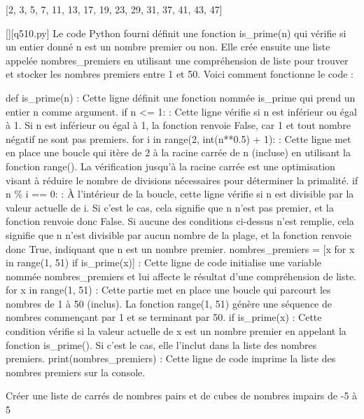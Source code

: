 [2, 3, 5, 7, 11, 13, 17, 19, 23, 29, 31, 37, 41, 43, 47]
        \par
        \begin{solution}
            \renewcommand{\nomfichier}{q510.py}
            \pythonfile{\chemincode \nomfichier}[][\nomfichier]
            Le code Python fourni définit une fonction is\_prime(n) qui vérifie si un entier donné n est un nombre premier ou non. Elle crée ensuite une liste appelée nombres\_premiers en utilisant une compréhension de liste pour trouver et stocker les nombres premiers entre 1 et 50. Voici comment fonctionne le code :

    def is\_prime(n) : Cette ligne définit une fonction nommée is\_prime qui prend un entier n comme argument.
        if n <= 1: : Cette ligne vérifie si n est inférieur ou égal à 1. Si n est inférieur ou égal à 1, la fonction renvoie False, car 1 et tout nombre négatif ne sont pas premiers.
        for i in range(2, int(n**0.5) + 1): : Cette ligne met en place une boucle qui itère de 2 à la racine carrée de n (incluse) en utilisant la fonction range(). La vérification jusqu'à la racine carrée est une optimisation visant à réduire le nombre de divisions nécessaires pour déterminer la primalité.
        if n \% i == 0: : À l'intérieur de la boucle, cette ligne vérifie si n est divisible par la valeur actuelle de i. Si c'est le cas, cela signifie que n n'est pas premier, et la fonction renvoie donc False.
        Si aucune des conditions ci-dessus n'est remplie, cela signifie que n n'est divisible par aucun nombre de la plage, et la fonction renvoie donc True, indiquant que n est un nombre premier.
    nombres\_premiers = [x for x in range(1, 51) if is\_prime(x)] : Cette ligne de code initialise une variable nommée nombres\_premiers et lui affecte le résultat d'une compréhension de liste.
        for x in range(1, 51) : Cette partie met en place une boucle qui parcourt les nombres de 1 à 50 (inclus). La fonction range(1, 51) génère une séquence de nombres commençant par 1 et se terminant par 50.
        if is\_prime(x) : Cette condition vérifie si la valeur actuelle de x est un nombre premier en appelant la fonction is\_prime(). Si c'est le cas, elle l'inclut dans la liste des nombres premiers.
    print(nombres\_premiers) : Cette ligne de code imprime la liste des nombres premiers sur la console.
        \end{solution}
        

        \question
        Créer une liste de carrés de nombres pairs et de cubes de nombres impairs de -5 à 5

